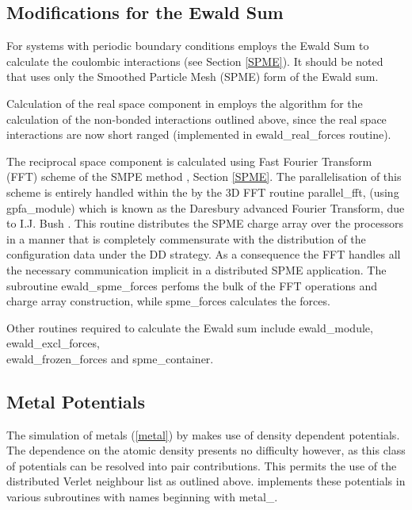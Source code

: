 \subsection{Modifications for the Ewald Sum}

For systems with periodic boundary conditions \D employs the Ewald
Sum to calculate the coulombic interactions
(see Section \ref{SPME}).  It should be noted that \D uses only the
Smoothed Particle Mesh (SPME) form of the Ewald sum.

Calculation of the real space component in \D employs the
algorithm for the calculation of the non-bonded interactions
outlined above, since the real space interactions are now short
ranged (implemented in {\sc ewald\_real\_forces} routine).

The reciprocal space component is calculated using Fast Fourier
Transform (FFT) scheme of the SMPE method \cite{essmann-95a,bush-06a},
Section \ref{SPME}.  The parallelisation of this scheme is entirely
handled within the \D by the 3D FFT routine {\sc parallel\_fft},
(using {\sc gpfa\_module}) which is known as the Daresbury advanced
Fourier Transform, due to I.J. Bush \cite{bush-00a}.  This routine
distributes the SPME charge array over the processors in a manner
that is completely commensurate with the distribution of the
configuration data under the DD strategy.  As a consequence the
FFT handles all the necessary communication implicit in a
distributed SPME application.  The \D subroutine {\sc ewald\_spme\_forces}
perfoms the bulk of the FFT operations and charge array construction,
while {\sc spme\_forces} calculates the forces.

Other routines required to calculate the Ewald sum include {\sc ewald\_module}, \\
{\sc ewald\_excl\_forces}, \\ {\sc ewald\_frozen\_forces} and {\sc spme\_container}.

\subsection{Metal Potentials}

The simulation of metals (\ref{metal}) by \D makes use of density
dependent potentials.  The dependence on the atomic density presents
no difficulty however, as this class of potentials can be resolved
into pair contributions.  This permits the use of the distributed
Verlet neighbour list as
outlined above.  \D implements these potentials in various
subroutines with names beginning with {\sc metal\_}.


